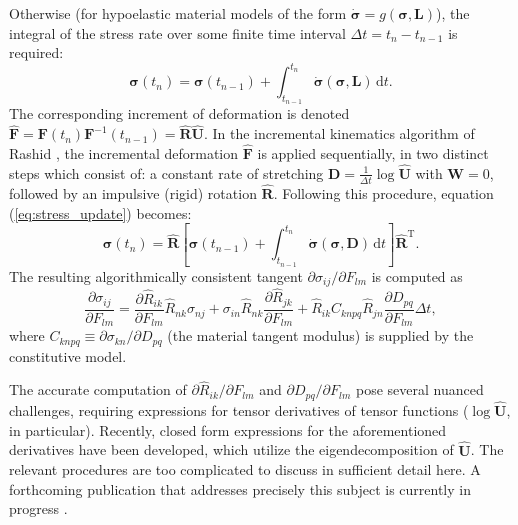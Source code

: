 	Otherwise (for hypoelastic material models of the form $\dot{\boldsymbol{\sigma}} = g(\boldsymbol{\sigma}, \bm{L})$), the integral of the stress rate over some finite time interval $\Delta t = t_{n} - t_{n-1}$ is required:
	\begin{equation}
		\boldsymbol{\sigma} (t_{n}) = \boldsymbol{\sigma} (t_{n-1}) + \int_{t_{n-1}}^{t_{n}} \dot{\boldsymbol{\sigma}} (\boldsymbol{\sigma}, \bm{L}) \, \mathrm dt.
		\label{eq:stress_update}
	\end{equation}
	The corresponding increment of deformation is denoted $\hat{\bm{F}} = \bm{F} (t_{n}) \bm{F}^{-1} (t_{n-1}) = \hat{\bm{R}} \hat{\bm{U}}$. In the incremental kinematics algorithm of Rashid \cite{Rashid:93}, the incremental deformation $\hat{\bm{F}}$ is applied sequentially, in two distinct steps which consist of: a constant rate of stretching $\bm{D} = \frac{1}{\Delta t} \log \hat{\bm{U}}$ with $\bm{W} = 0$, followed by an impulsive (rigid) rotation $\hat{\bm{R}}$. Following this procedure, equation (\ref{eq:stress_update}) becomes:
	\begin{equation}
		\boldsymbol{\sigma} (t_{n}) = \hat{\bm{R}} \left[ \boldsymbol{\sigma} (t_{n-1}) + \int_{t_{n-1}}^{t_{n}} \dot{\boldsymbol{\sigma}} (\boldsymbol{\sigma}, \bm{D}) \, \mathrm dt \right] \hat{\bm{R}}^{\mathrm T}.
	\end{equation}
	The resulting algorithmically consistent tangent $\partial \sigma_{ij} / \partial F_{lm}$ is computed as
	\begin{equation}
		\frac{\partial \sigma_{ij}}{\partial F_{lm}} = \frac{\partial \hat{R}_{ik}}{\partial F_{lm}} \hat{R}_{nk} \sigma_{nj} + \sigma_{in} \hat{R}_{nk} \frac{\partial \hat{R}_{jk}}{\partial F_{lm}} + \hat{R}_{ik} C_{knpq} \hat{R}_{jn} \frac{\partial D_{pq}}{\partial F_{lm}} \Delta t,
	\end{equation}
	where $C_{knpq} \equiv \partial \sigma_{kn} / \partial D_{pq}$ (the material tangent modulus) is supplied by the constitutive model.
	
	The accurate computation of $\partial \hat{R}_{ik} / \partial F_{lm}$ and $\partial D_{pq} / \partial F_{lm}$ pose several nuanced challenges, requiring expressions for tensor derivatives of tensor functions ($\log \hat{\bm{U}}$, in particular). Recently, closed form expressions for the aforementioned derivatives have been developed, which utilize the eigendecomposition of $\hat{\bm{U}}$. The relevant procedures are too complicated to discuss in sufficient detail here. A forthcoming publication that addresses precisely this subject is currently in progress \cite{kinematics_paper}.
	
